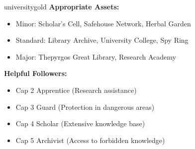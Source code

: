 \documentclass[11pt]{article}
\begin{document}
\begin{campaignsection}{universitygold}
\textbf{Appropriate Assets:}
\begin{itemize}
    \item Minor: Scholar's Cell, Safehouse Network, Herbal Garden
    \item Standard: Library Archive, University College, Spy Ring
    \item Major: Thepyrgos Great Library, Research Academy
\end{itemize}

\textbf{Helpful Followers:}
\begin{itemize}
    \item Cap 2 Apprentice (Research assistance)
    \item Cap 3 Guard (Protection in dangerous areas)
    \item Cap 4 Scholar (Extensive knowledge base)
    \item Cap 5 Archivist (Access to forbidden knowledge)
\end{itemize}
\end{campaignsection}

\newpage
\end{document}
